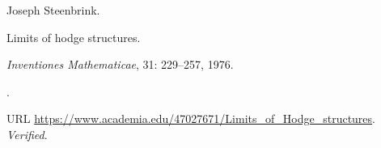 Joseph Steenbrink.

\newblock Limits of hodge structures.

\newblock \emph{Inventiones Mathematicae}, 31: 229--257, 1976.

\newblock {}.

\newblock URL
  \url{https://www.academia.edu/47027671/Limits_of_Hodge_structures}.
\newblock \emph{Verified}.

